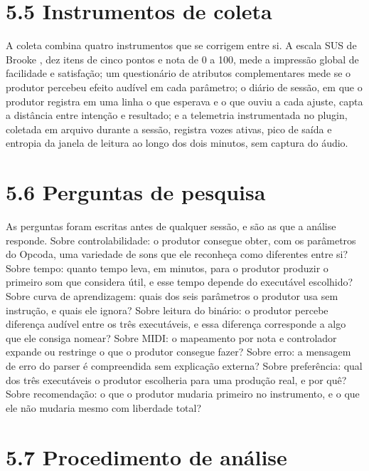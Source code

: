 \documentclass[11pt,a4paper]{article}
\begin{document}
\section*{5.5 Instrumentos de coleta}

A coleta combina quatro instrumentos que se corrigem entre si. A escala SUS de Brooke \cite{brooke1996}, dez itens de cinco pontos e nota de 0 a 100, mede a impressão global de facilidade e satisfação; um questionário de atributos complementares mede se o produtor percebeu efeito audível em cada parâmetro; o diário de sessão, em que o produtor registra em uma linha o que esperava e o que ouviu a cada ajuste, capta a distância entre intenção e resultado; e a telemetria instrumentada no plugin, coletada em arquivo durante a sessão, registra vozes ativas, pico de saída e entropia da janela de leitura ao longo dos dois minutos, sem captura do áudio.


\section*{5.6 Perguntas de pesquisa}

As perguntas foram escritas antes de qualquer sessão, e são as que a análise responde. Sobre controlabilidade: o produtor consegue obter, com os parâmetros do Opcoda, uma variedade de sons que ele reconheça como diferentes entre si? Sobre tempo: quanto tempo leva, em minutos, para o produtor produzir o primeiro som que considera útil, e esse tempo depende do executável escolhido? Sobre curva de aprendizagem: quais dos seis parâmetros o produtor usa sem instrução, e quais ele ignora? Sobre leitura do binário: o produtor percebe diferença audível entre os três executáveis, e essa diferença corresponde a algo que ele consiga nomear? Sobre MIDI: o mapeamento por nota e controlador expande ou restringe o que o produtor consegue fazer? Sobre erro: a mensagem de erro do parser é compreendida sem explicação externa? Sobre preferência: qual dos três executáveis o produtor escolheria para uma produção real, e por quê? Sobre recomendação: o que o produtor mudaria primeiro no instrumento, e o que ele não mudaria mesmo com liberdade total?


\section*{5.7 Procedimento de análise}
\end{document}
